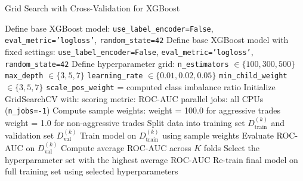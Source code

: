 \begin{algorithm}[H]
\caption{Grid Search with Cross-Validation for XGBoost}\label{alg: grid_search}
\begin{algorithmic}[1]
    \State Define base XGBoost model:
    \Statex \hspace{\algorithmicindent} \texttt{use\_label\_encoder=False}, \texttt{eval\_metric='logloss'}, \texttt{random\_state=42}
    \State Define base XGBoost model with fixed settings:
    \Statex \hspace{\algorithmicindent} \texttt{use\_label\_encoder=False}, \texttt{eval\_metric='logloss'}, \texttt{random\_state=42}
    \State Define hyperparameter grid:
    \Statex \hspace{\algorithmicindent} \texttt{n\_estimators} $\in \{100, 300, 500\}$
    \Statex \hspace{\algorithmicindent} \texttt{max\_depth} $\in \{3, 5, 7\}$
    \Statex \hspace{\algorithmicindent} \texttt{learning\_rate} $\in \{0.01, 0.02, 0.05\}$
    \Statex \hspace{\algorithmicindent} \texttt{min\_child\_weight} $\in \{3, 5, 7\}$
    \Statex \hspace{\algorithmicindent} \texttt{scale\_pos\_weight} = computed class imbalance ratio
    \State Initialize GridSearchCV with:
    \Statex \hspace{\algorithmicindent} scoring metric: ROC-AUC
    \Statex \hspace{\algorithmicindent} parallel jobs: all CPUs (\texttt{n\_jobs=-1})
    \State Compute sample weights:
    \Statex \hspace{\algorithmicindent} weight = 100.0 for aggressive trades
    \Statex \hspace{\algorithmicindent} weight = 1.0 for non-aggressive trades
            \State Split data into training set $D_{\text{train}}^{(k)}$ and validation set $D_{\text{val}}^{(k)}$
            \State Train model on $D_{\text{train}}^{(k)}$ using sample weights
            \State Evaluate ROC-AUC on $D_{\text{val}}^{(k)}$
        \EndFor
        \State Compute average ROC-AUC across $K$ folds
    \EndFor
    \State Select the hyperparameter set with the highest average ROC-AUC
    \State Re-train final model on full training set using selected hyperparameters
\end{algorithmic}
\end{algorithm}

